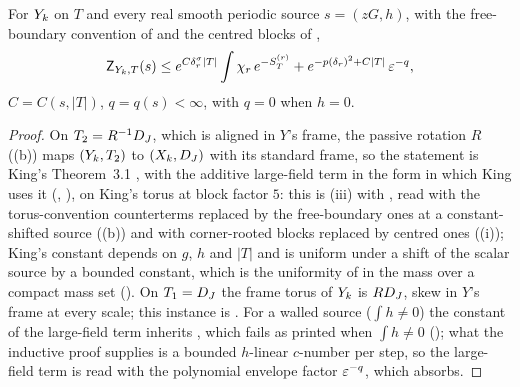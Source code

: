 








\begin{proposition}\label{rot:prop:H3}
For $Y_k$ on $T$ and every real smooth periodic source $s=(zG,h)$, with the free-boundary convention of  and the centred blocks of ,
\[
\mathsf Z_{Y_k,T}(s)\le e^{C\delta_r^\sigma|T|}\int\chi_r\,e^{-S^{(r)}_T}+e^{-p(\delta_r)^2+C|T|}\,\varepsilon^{-q},
\]
$C=C(s,|T|)$, $q=q(s)<\infty$, with $q=0$ when $h=0$.
\end{proposition}
\begin{proof}
On $T_2=R^{-1}D_J$, which is aligned in $Y$'s frame, the passive rotation $R$ ((b)) maps $(Y_k,T_2)$ to $(X_k,D_J)$ with its standard frame, so the statement is King's Theorem~3.1 \cite[(3.4)]{K1}, with the additive large-field term in the form in which King uses it (\cite[(3.11)]{K1}, \cite[(4.7)]{K2}), on King's torus at block factor $5$: this is (iii) with , read with the torus-convention counterterms replaced by the free-boundary ones at a constant-shifted source ((b)) and with corner-rooted blocks replaced by centred ones ((i)); King's constant depends on $g$, $h$ and $|T|$ and is uniform under a shift of the scalar source by a bounded constant, which is the uniformity of \cite[Thm.~3.1]{K1} in the mass over a compact mass set (\cite[p.~655]{K1}). On $T_1=D_J$ the frame torus of $Y_k$ is $RD_J$, skew in $Y$'s frame at every scale; this instance is . For a walled source ($\int h\ne0$) the constant of the large-field term inherits \cite[(2.23)]{K1}, which fails as printed when $\int h\ne0$ (); what the inductive proof supplies is a bounded $h$-linear $c$-number per step, so the large-field term is read with the polynomial envelope factor $\varepsilon^{-q}$, which  absorbs.
\end{proof}






